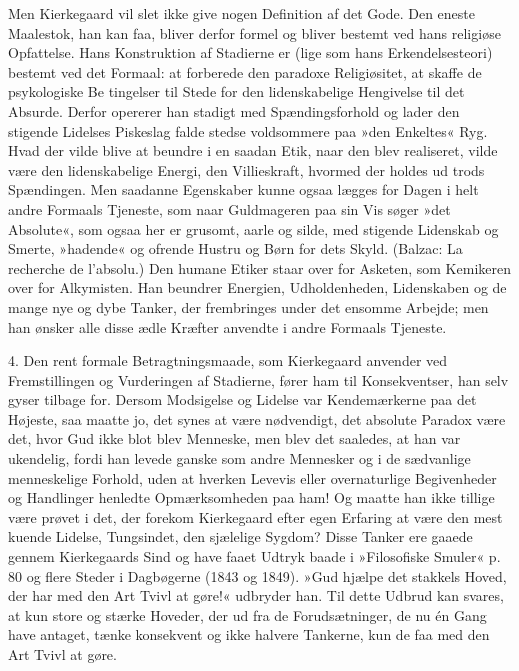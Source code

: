 \documentclass[12pt,a4paper,openany]{book}
\newcommand{\opage}[1]{\marginnote{\footnotesize\textit{[#1]}}}
\begin{document}
Men Kierkegaard vil slet ikke give nogen Definition
af det Gode. Den eneste Maalestok, han kan faa, bliver
derfor formel og bliver bestemt ved hans religiøse Opfattelse.
Hans Konstruktion af Stadierne er (lige som hans
Erkendelsesteori) bestemt ved det Formaal: at forberede
den paradoxe Religiøsitet, at skaffe de psykologiske Be%
\opage{124}tingelser til Stede for den lidenskabelige Hengivelse til
det Absurde. Derfor opererer han stadigt med Spændingsforhold
og lader den stigende Lidelses Piskeslag falde stedse
voldsommere paa »den Enkeltes« Ryg. Hvad der vilde
blive at beundre i en saadan Etik, naar den blev realiseret,
vilde være den lidenskabelige Energi, den Villieskraft,
hvormed der holdes ud trods Spændingen. Men
saadanne Egenskaber kunne ogsaa lægges for Dagen i
helt andre Formaals Tjeneste, som naar Guldmageren paa
sin Vis søger »det Absolute«, som ogsaa her er grusomt,
aarle og silde, med stigende Lidenskab og Smerte,
»hadende« og ofrende Hustru og Børn for dets Skyld.
(Balzac: La recherche de l'absolu.) Den humane Etiker
staar over for Asketen, som Kemikeren over for Alkymisten.
Han beundrer Energien, Udholdenheden, Lidenskaben
og de mange nye og dybe Tanker, der frembringes
under det ensomme Arbejde; men han ønsker
alle disse ædle Kræfter anvendte i andre Formaals
Tjeneste.

4. Den rent formale Betragtningsmaade, som Kierkegaard
anvender ved Fremstillingen og Vurderingen af
Stadierne, fører ham til Konsekventser, han selv gyser
tilbage for. Dersom Modsigelse og Lidelse var Kendemærkerne
paa det Højeste, saa maatte jo, det synes at
være nødvendigt, det absolute Paradox være det, hvor
Gud ikke blot blev Menneske, men blev det saaledes, at
han var ukendelig, fordi han levede ganske som andre
Mennesker og i de sædvanlige menneskelige Forhold,
uden at hverken Levevis eller overnaturlige Begivenheder
og Handlinger henledte Opmærksomheden paa ham! Og
maatte han ikke tillige være prøvet i det, der forekom
Kierkegaard efter egen Erfaring at være den mest kuende
Lidelse, Tungsindet, den sjælelige Sygdom? Disse Tanker
ere gaaede gennem Kierkegaards Sind og have faaet
\opage{125}Udtryk baade i »Filosofiske Smuler« p. 80 og flere Steder
i Dagbøgerne (1843 og 1849). »Gud hjælpe det stakkels
Hoved, der har med den Art Tvivl at gøre!« udbryder
han. Til dette Udbrud kan svares, at kun store og
stærke Hoveder, der ud fra de Forudsætninger, de nu én
Gang have antaget, tænke konsekvent og ikke halvere
Tankerne, kun de faa med den Art Tvivl at gøre.
\end{document}
